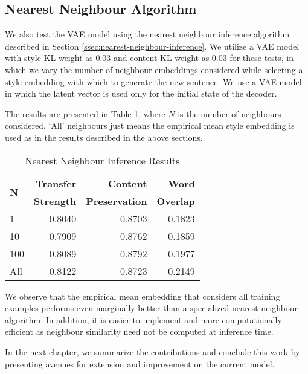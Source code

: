 \subsection{Nearest Neighbour Algorithm}

We also test the VAE model using the nearest neighbour inference algorithm described in Section \ref{ssec:nearest-neighbour-inference}. We utilize a VAE model with style KL-weight as $0.03$ and content KL-weight as $0.03$ for these tests, in which we vary the number of neighbour embeddings considered while selecting a style embedding with which to generate the new sentence. We use a VAE model in which the latent vector is used only for the initial state of the decoder.

The results are presented in Table \ref{tab:nearest-neighbour-inference-results}, where $N$ is the number of neighbours considered. `All' neighbours just means the empirical mean style embedding is used as in the results described in the above sections.

\begin{table}[ht]
	\centering
	\begin{tabular}{| l | r | r | r |}
		\hline
		\multirow{2}{*}{
		\textbf{N}} & \textbf{Transfer} & \textbf{Content}      & \textbf{Word}    \\
		            & \textbf{Strength} & \textbf{Preservation} & \textbf{Overlap} \\
		\hline
		\hline
		1           & 0.8040            & 0.8703                & 0.1823           \\
		\hline
		10          & 0.7909            & 0.8762                & 0.1859           \\
		\hline
		100         & 0.8089            & 0.8792                & 0.1977           \\
		\hline
		All         & 0.8122            & 0.8723                & 0.2149           \\
		\hline
	\end{tabular}
	\caption{Nearest Neighbour Inference Results}
	\label{tab:nearest-neighbour-inference-results}
\end{table}

We observe that the empirical mean embedding that considers all training examples performs even marginally better than a specialized nearest-neighbour algorithm. In addition, it is easier to implement and more computationally efficient as neighbour similarity need not be computed at inference time.


In the next chapter, we summarize the contributions and conclude this work by presenting avenues for extension and improvement on the current model.
